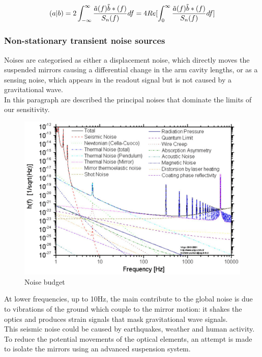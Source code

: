 \documentclass[binding=0.6cm, LaM]{sapthesis}
\begin{document}
		\begin{equation}
		(a|b) = 2 \int^{\infty}_{-\infty} {{\tilde{a}(f)\tilde{b}\ast(f)} \over {S_n(f)}}df = 4 Re [\int^{\infty}_{0}{{\tilde{a}(f)\tilde{b}\ast(f)} \over {S_n(f)}} df]
		\end{equation}


\subsubsection{Non-stationary transient noise sources}

	Noises are categorised as either a displacement noise, which directly moves the suspended mirrors
        causing a differential change in the arm cavity lengths, or as a sensing noise,
        which appears in the readout signal but is not caused by a gravitational wave. \\
        In this paragraph are described the principal noises that dominate the limits of our sensitivity.

                \begin{figure}
                        \includegraphics[scale=0.3]{noisetwo}
                        \centering
                        \caption{Noise budget}
                        \label{fig:noisetwo}
                \end{figure}

        At lower frequencies, up to 10Hz, the main contribute to the global noise
        is due to vibrations of the ground which couple to the mirror motion: it shakes the optics and produces strain signals that mask gravitational wave signals. \\
        This seismic noise could be caused by earthquakes, weather and human activity.
        To reduce the potential movements of the optical elements, an attempt is made to
        isolate the mirrors using an advanced suspension system. \\
\end{document}
